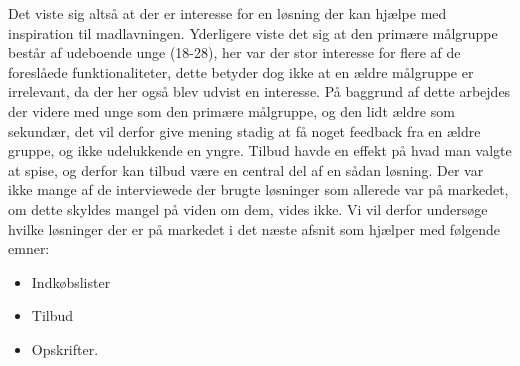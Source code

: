 Det viste sig altså at der er interesse for en løsning der kan hjælpe med inspiration til madlavningen. 
Yderligere viste det sig at den primære målgruppe består af udeboende unge (18-28), her var der stor interesse for flere af de foreslåede funktionaliteter, dette betyder dog ikke at en ældre målgruppe er irrelevant, da der her også blev udvist en interesse.
På baggrund af dette arbejdes der videre med unge som den primære målgruppe, og den lidt ældre som sekundær, det vil derfor give mening stadig at få noget feedback fra en ældre gruppe, og ikke udelukkende en yngre.
Tilbud havde en effekt på hvad man valgte at spise, og derfor kan tilbud være en central del af en sådan løsning.
Der var ikke mange af de interviewede der brugte løsninger som allerede var på markedet, om dette skyldes mangel på viden om dem, vides ikke.
Vi vil derfor undersøge hvilke løsninger der er på markedet i det næste afsnit som hjælper med følgende emner:

\begin{itemize}
	\item Indkøbslister
	\item Tilbud
	\item Opskrifter.
\end{itemize}
